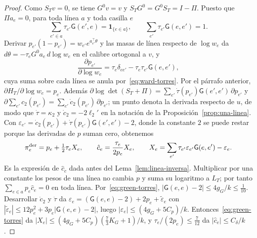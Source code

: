 \begin{proof}
Como $S_Tv=0$, se tiene $G^0v=v$ y $S_TG^0=G^0S_T=I-\Pi$. Puesto que $\Pi a_e=0$, para toda línea $a$ y
toda casilla $e$
\begin{equation}\label{eq:ward-torres}
 \sum_{e'\in a}\tau_{e'}\mathsf G(e',e)=\mathbf1_{\{e\in a\}},\qquad
 \sum_{e'}\tau_{e'}\mathsf G(e,e')=1 .
\end{equation}
Derivar $p_{e'}(1-p_{e'})=w_{e'}e^{a_{e'}^\top\theta}$ y las masas de línea respecto de $\log w_e$ da
$d\theta=-\tau_eG^0a_e\,d\log w_e$ en el calibre ortogonal a $v$, y
\[
 \frac{\partial p_{e'}}{\partial\log w_e}=\tau_e\delta_{ee'}-\tau_e\tau_{e'}\mathsf G(e,e'),
\]
cuya suma sobre cada línea se anula por~\eqref{eq:ward-torres}. Por el párrafo anterior, $\partial
H_T/\partial\log w_e=p_e$. Además $\partial\log\det(S_T+\Pi)=\sum_{e'}\dot\tau(p_{e'})\mathsf
G(e',e')\,\partial p_{e'}$ y $\partial\sum_{e'}c_2(p_{e'})=\sum_{e'}\dot c_2(p_{e'})\,\partial p_{e'}$; un
punto denota la derivada respecto de $u$, de modo que $\dot\tau=\kappa_2$ y $\dot c_2=-2\ell_2'$ en la
notación de la Proposición~\ref{prop:una-linea}.
Con $\varepsilon_{e'}=\dot c_2(p_{e'})+\dot\tau(p_{e'})\mathsf G(e',e')-2$, donde la constante $2$ se
puede restar porque las derivadas de $p$ suman cero, obtenemos
\begin{equation}\label{eq:chat-torres}
 \pi_e^{\rm der}=p_e+\tfrac12\tau_eX_e,\qquad \hat c_e=\frac{\tau_e}{2p_e}X_e,\qquad
 X_e=\sum_{e'}\tau_{e'}\varepsilon_{e'}\mathsf G(e,e')-\varepsilon_e .
\end{equation}
Es la expresión de $\hat c_c$ dada antes del Lema~\ref{lem:linea-inversa}. Multiplicar por una constante
los pesos de una línea no cambia $p$ y suma su logaritmo a $L_T$; por tanto
$\sum_{e\in a}p_e\hat c_e=0$ en toda línea. Por~\eqref{eq:green-torres}, $|\mathsf G(e,e)-2|\le4g_G/k
\le\tfrac1{10}$. Desarrollar $\dot c_2$ y $\dot\tau$ da $\varepsilon_e=(\mathsf G(e,e)-2)+2p_e+\tilde
\varepsilon_e$ con $|\tilde\varepsilon_e|\le12p_e^2+3p_e|\mathsf G(e,e)-2|$, luego
$|\varepsilon_e|\le(4g_G+5C_p)/k$. Entonces~\eqref{eq:green-torres} da
$|X_e|\le(4g_G+5C_p)(\tfrac73K_G+1)/k$, y $\tau_e/(2p_e)\le\tfrac7{12}$ da $|\hat c_e|\le
C_\delta/k$.


\end{proof}
